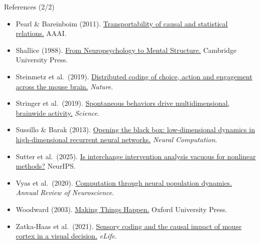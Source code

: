 \documentclass[aspectratio=169,11pt]{beamer}
\begin{document}
\begin{frame}{References (2/2)}
\vspace{-0.3em}
{\scriptsize
\begin{itemize}\setlength\itemsep{0pt}
  \item Pearl \& Bareinboim (2011). \href{https://arxiv.org/abs/1203.3519}{Transportability of causal and statistical relations.} AAAI.
  \item Shallice (1988). \href{https://doi.org/10.1017/CBO9780511526817}{From Neuropsychology to Mental Structure.} Cambridge University Press.
  \item Steinmetz et al.\ (2019). \href{https://doi.org/10.1038/s41586-019-1787-x}{Distributed coding of choice, action and engagement across the mouse brain.} \textit{Nature}.
  \item Stringer et al.\ (2019). \href{https://doi.org/10.1126/science.aav7893}{Spontaneous behaviors drive multidimensional, brainwide activity.} \textit{Science}.
  \item Sussillo \& Barak (2013). \href{https://doi.org/10.1162/NECO_a_00409}{Opening the black box: low-dimensional dynamics in high-dimensional recurrent neural networks.} \textit{Neural Computation}.
  \item Sutter et al.\ (2025). \href{https://arxiv.org/abs/2501.02043}{Is interchange intervention analysis vacuous for nonlinear methods?} NeurIPS.
  \item Vyas et al.\ (2020). \href{https://doi.org/10.1146/annurev-neuro-092619-094115}{Computation through neural population dynamics.} \textit{Annual Review of Neuroscience}.
  \item Woodward (2003). \href{https://doi.org/10.1093/0195155270.001.0001}{Making Things Happen.} Oxford University Press.
  \item Zatka-Haas et al.\ (2021). \href{https://doi.org/10.7554/eLife.63163}{Sensory coding and the causal impact of mouse cortex in a visual decision.} \textit{eLife}.
\end{itemize}
}
\end{frame}
\end{document}
